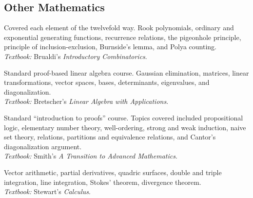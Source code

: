 \documentclass[11pt,letterpaper,sans]{moderncv}
\begin{document}
\subsection{Other Mathematics}

%
  {Covered each element of the twelvefold way. Rook polynomials, ordinary and exponential generating functions, recurrence relations, the pigeonhole principle, principle of inclusion-exclusion, Burnside's lemma, and Polya counting.   \\ \emph{Textbook: }Brualdi's \emph{Introductory Combinatorics}.}

%
  {Standard proof-based linear algebra course. Gaussian elimination, matrices, linear transformations, vector spaces, bases, determinants, eigenvalues, and diagonalization.\\ \emph{Textbook: }Bretscher's \emph{Linear Algebra with Applications}.}

%
  {Standard ``introduction to proofs'' course. Topics covered included propositional logic, elementary number theory, well-ordering, strong and weak induction, naive set theory, relations, partitions and equivalence relations, and Cantor's diagonalization argument. \\ \emph{Textbook: }Smith's \emph{A Transition to Advanced Mathematics}.}

%
  {Vector arithmetic, partial derivatives, quadric surfaces, double and triple integration, line integration, Stokes' theorem, divergence theorem. \\ \emph{Textbook: }Stewart's \emph{Calculus}.}
\end{document}
